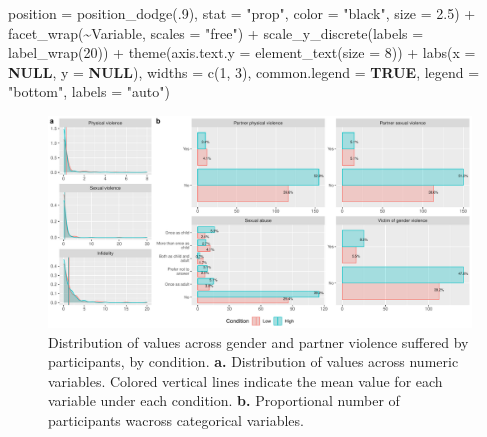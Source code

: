 \documentclass[
  bookmarksnumbered]{article}
\newenvironment{Shaded}{\begin{snugshade}}{\end{snugshade}}
\newcommand{\AttributeTok}[1]{\textcolor[rgb]{0.80,0.80,0.80}{#1}}
\newcommand{\ConstantTok}[1]{\textcolor[rgb]{0.86,0.64,0.64}{\textbf{#1}}}
\newcommand{\DecValTok}[1]{\textcolor[rgb]{0.86,0.86,0.80}{#1}}
\newcommand{\FloatTok}[1]{\textcolor[rgb]{0.75,0.75,0.82}{#1}}
\newcommand{\FunctionTok}[1]{\textcolor[rgb]{0.94,0.94,0.56}{#1}}
\newcommand{\NormalTok}[1]{\textcolor[rgb]{0.80,0.80,0.80}{#1}}
\newcommand{\SpecialCharTok}[1]{\textcolor[rgb]{0.86,0.64,0.64}{#1}}
\newcommand{\StringTok}[1]{\textcolor[rgb]{0.80,0.58,0.58}{#1}}
\begin{document}
\begin{Shaded}
\begin{Highlighting}[]
                      \AttributeTok{position =} \FunctionTok{position\_dodge}\NormalTok{(.}\DecValTok{9}\NormalTok{),}
                      \AttributeTok{stat =} \StringTok{"prop"}\NormalTok{,}
                      \AttributeTok{color =} \StringTok{"black"}\NormalTok{,}
                      \AttributeTok{size =} \FloatTok{2.5}\NormalTok{) }\SpecialCharTok{+}
            \FunctionTok{facet\_wrap}\NormalTok{(}\SpecialCharTok{\textasciitilde{}}\NormalTok{Variable, }
                       \AttributeTok{scales =} \StringTok{"free"}\NormalTok{) }\SpecialCharTok{+}
            \FunctionTok{scale\_y\_discrete}\NormalTok{(}\AttributeTok{labels =} \FunctionTok{label\_wrap}\NormalTok{(}\DecValTok{20}\NormalTok{)) }\SpecialCharTok{+}
            \FunctionTok{theme}\NormalTok{(}\AttributeTok{axis.text.y =} \FunctionTok{element\_text}\NormalTok{(}\AttributeTok{size =} \DecValTok{8}\NormalTok{)) }\SpecialCharTok{+}
            \FunctionTok{labs}\NormalTok{(}\AttributeTok{x =} \ConstantTok{NULL}\NormalTok{, }\AttributeTok{y =} \ConstantTok{NULL}\NormalTok{),}
          \AttributeTok{widths =} \FunctionTok{c}\NormalTok{(}\DecValTok{1}\NormalTok{, }\DecValTok{3}\NormalTok{),}
          \AttributeTok{common.legend =} \ConstantTok{TRUE}\NormalTok{,}
          \AttributeTok{legend =} \StringTok{"bottom"}\NormalTok{,}
          \AttributeTok{labels =} \StringTok{"auto"}\NormalTok{)}
\end{Highlighting}
\end{Shaded}

\begin{figure}
\centering
\includegraphics{Supplementary_material_files/figure-latex/gender-violence-desc-plot-1.pdf}
\caption{\label{fig:gender-violence-desc-plot}Distribution of values across gender and partner violence suffered by participants, by condition. \textbf{a.} Distribution of values across numeric variables. Colored vertical lines indicate the mean value for each variable under each condition. \textbf{b.} Proportional number of participants wacross categorical variables.}
\end{figure}
\end{document}
